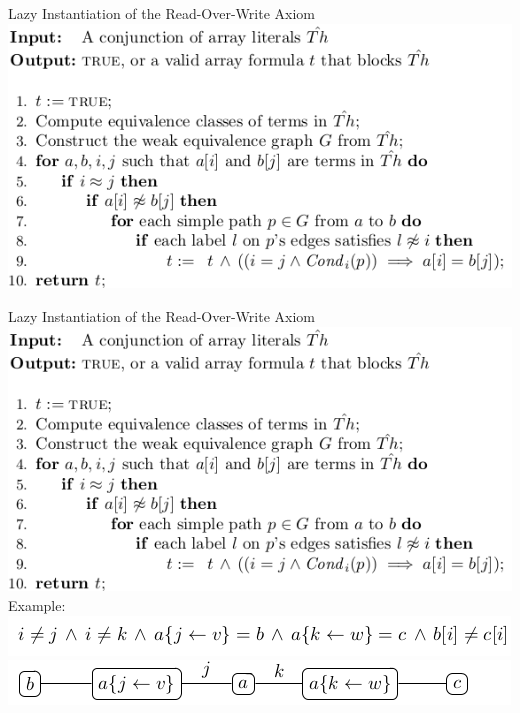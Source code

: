 \documentclass{beamer}
\begin{document}
\begin{frame}{Lazy Instantiation of the Read-Over-Write Axiom}
\includegraphics[scale=0.5]{array-encoding-procedure.png}\newline
\end{frame}

\begin{frame}{Lazy Instantiation of the Read-Over-Write Axiom}
\includegraphics[scale=0.5]{array-encoding-procedure.png}\newline
Example:\newline
\includegraphics[scale=0.5]{weak1.png}\newline
\includegraphics[scale=0.5]{weak2.png}\newline
\end{frame}
\end{document}
